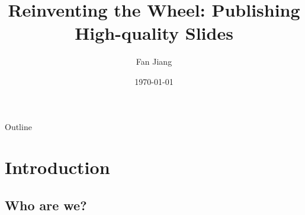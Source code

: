 \documentclass{beamer}
\title{Reinventing the Wheel: Publishing High-quality Slides}
\author{Fan Jiang}
\institute{Southern Univ. of Science and Technology (SUSTech)}
\date{\today}
\begin{document}

\frame{\titlepage}

\section[Outline]{}
\begin{frame}{Outline}
  \tableofcontents
\end{frame}

\section{Introduction}
\subsection{Who are we?}
\end{document}
